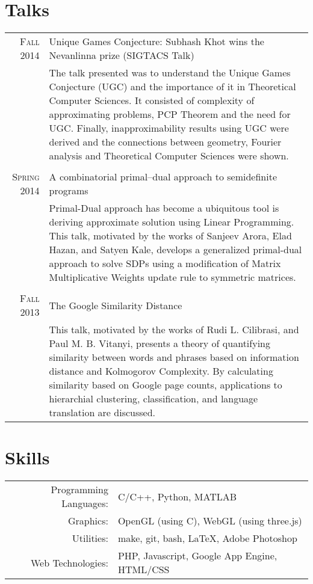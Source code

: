 \documentclass[a4paper,10pt]{article}
\begin{document}
\section{Talks}
\begin{tabular}{r|p{12cm}}
 \textsc{Fall 2014} & Unique Games Conjecture: Subhash Khot wins the Nevanlinna prize (SIGTACS Talk)\\
 &\small{The talk presented was to understand the Unique Games Conjecture (UGC) and the importance of it in Theoretical Computer Sciences. It consisted of complexity of approximating problems, PCP Theorem and the need for UGC. Finally, inapproximability results using UGC were derived and the connections between geometry, Fourier analysis and Theoretical Computer Sciences were shown.}\\
 \multicolumn{2}{c}{} \\
 \textsc{Spring 2014} & A combinatorial primal–dual approach to semidefinite programs\\ 
 &\small{Primal-Dual approach has become a ubiquitous tool is deriving approximate solution using Linear Programming. This talk, motivated by the works of Sanjeev Arora, Elad Hazan, and Satyen Kale, develops a generalized primal-dual approach to solve SDPs using a modification of Matrix Multiplicative Weights update rule to symmetric matrices.}\\
 \multicolumn{2}{c}{} \\
\textsc{Fall 2013} & The Google Similarity Distance\\
&\small{This talk, motivated by the works of Rudi L. Cilibrasi, and Paul M. B. Vitanyi, presents a theory of quantifying similarity between words and phrases based on information distance and Kolmogorov Complexity. By calculating similarity based on Google page counts, applications to hierarchial clustering, classification, and language translation are discussed.}\\
\end{tabular}

\section{Skills}
\begin{tabular}{rl}
Programming Languages: & C/C++, Python, MATLAB\\
Graphics: & OpenGL (using C), WebGL (using three.js)\\
Utilities: & make, git, bash, \LaTeX, Adobe Photoshop\\
Web Technologies: & PHP, Javascript, Google App Engine, HTML/CSS\\
\end{tabular}
\end{document}

